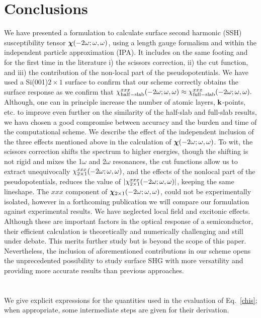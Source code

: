 \documentclass[floatfix,prb,aps,superscriptaddress,11pt,preprint,letterpaper]{revtex4}
\begin{document}
\section{Conclusions}\label{conc}

We have presented a formulation to calculate surface second harmonic
(SSH) susceptibility tensor $\boldsymbol{\chi}(-2\omega;\omega,\omega)$,  using a length gauge
formalism and within the independent particle approximation (IPA).
It includes on the same footing and for the first time in the literature 
i) the scissors correction, ii) the cut function, and iii) the 
contribution of the non-local part of the pseudopotentials. 
We have used a Si(001)$2\times 1$ surface to confirm that our scheme
correctly obtains the surface response as we confirm
that 
$\chi_{\mathrm{half-slab}}^{xxx}(-2\omega;\omega,\omega) 
\approx
\chi_{\mathrm{full-slab}}^{xxx}(-2\omega;\omega,\omega) 
. 
$
Although, one can in principle increase the number of atomic layers,
$\mathbf{k}$-points, etc.  to
improve even further on the similarity of the half-slab and full-slab results, we
hava chosen a good compromise between accuracy and the burden and time
of the computational scheme. 
We describe the effect of the independent inclusion of the three
effects mentioned above in the calculation of  
$\boldsymbol{\chi}(-2\omega;\omega,\omega)$. To wit,
the scissors correction shifts the spectrum to higher energies, though
the shifting is not rigid and mixes the 1$\omega$ and 2$\omega$
resonances, the cut functions
allow us
to extract unequivocally   
$\chi^{xxx}_{2\times 1}(-2\omega;\omega,\omega)$, 
and the effects of the nonlocal part of the pseudopotentials,
reduces the value of   
$|\chi^{xxx}_{2\times 1}(-2\omega;\omega,\omega)|$, keeping the same lineshape. 
The $xxx$ component of  
$\boldsymbol{\chi}_{2\times 1}(-2\omega;\omega,\omega)$, 
could not be
experimentally  isolated,
however in a forthcoming publication 
we will compare our formulation 
against
experimental 
results. 
We have neglected
local field 
and excitonic effects.
Although these are important factors in the optical response of a semiconductor,
their efficient calculation is theoretically and 
numerically challenging and still 
under debate.\cite{beyond}  
This merits further study but is beyond the scope of this paper. 
Nevertheless, the inclusion of aforementioned contributions 
in
our scheme opens the unprecedented possibility to study 
surface SHG with more versatility and providing 
more accurate results than previous approaches. 





\appendix 
\section{}\label{appe}
We give explicit expressions for the quantities used in the evaluation 
of Eq.~\eqref{chis}; when appropriate, some 
intermediate steps are given for their derivation. 
\end{document}
